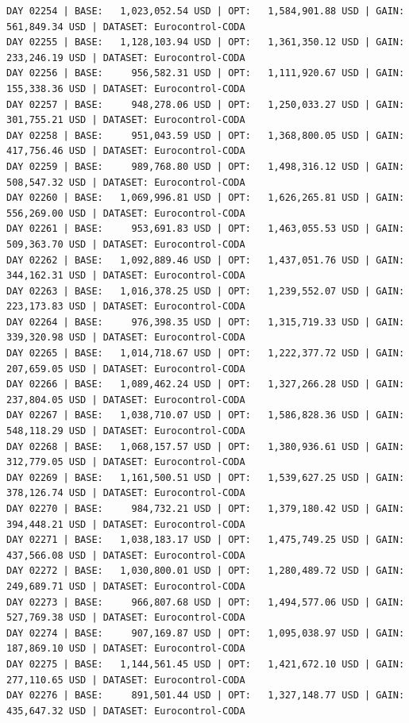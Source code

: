 \documentclass[11pt,a4paper]{article}
\begin{document}
\begin{verbatim}
DAY 02254 | BASE:   1,023,052.54 USD | OPT:   1,584,901.88 USD | GAIN: 561,849.34 USD | DATASET: Eurocontrol-CODA
DAY 02255 | BASE:   1,128,103.94 USD | OPT:   1,361,350.12 USD | GAIN: 233,246.19 USD | DATASET: Eurocontrol-CODA
DAY 02256 | BASE:     956,582.31 USD | OPT:   1,111,920.67 USD | GAIN: 155,338.36 USD | DATASET: Eurocontrol-CODA
DAY 02257 | BASE:     948,278.06 USD | OPT:   1,250,033.27 USD | GAIN: 301,755.21 USD | DATASET: Eurocontrol-CODA
DAY 02258 | BASE:     951,043.59 USD | OPT:   1,368,800.05 USD | GAIN: 417,756.46 USD | DATASET: Eurocontrol-CODA
DAY 02259 | BASE:     989,768.80 USD | OPT:   1,498,316.12 USD | GAIN: 508,547.32 USD | DATASET: Eurocontrol-CODA
DAY 02260 | BASE:   1,069,996.81 USD | OPT:   1,626,265.81 USD | GAIN: 556,269.00 USD | DATASET: Eurocontrol-CODA
DAY 02261 | BASE:     953,691.83 USD | OPT:   1,463,055.53 USD | GAIN: 509,363.70 USD | DATASET: Eurocontrol-CODA
DAY 02262 | BASE:   1,092,889.46 USD | OPT:   1,437,051.76 USD | GAIN: 344,162.31 USD | DATASET: Eurocontrol-CODA
DAY 02263 | BASE:   1,016,378.25 USD | OPT:   1,239,552.07 USD | GAIN: 223,173.83 USD | DATASET: Eurocontrol-CODA
DAY 02264 | BASE:     976,398.35 USD | OPT:   1,315,719.33 USD | GAIN: 339,320.98 USD | DATASET: Eurocontrol-CODA
DAY 02265 | BASE:   1,014,718.67 USD | OPT:   1,222,377.72 USD | GAIN: 207,659.05 USD | DATASET: Eurocontrol-CODA
DAY 02266 | BASE:   1,089,462.24 USD | OPT:   1,327,266.28 USD | GAIN: 237,804.05 USD | DATASET: Eurocontrol-CODA
DAY 02267 | BASE:   1,038,710.07 USD | OPT:   1,586,828.36 USD | GAIN: 548,118.29 USD | DATASET: Eurocontrol-CODA
DAY 02268 | BASE:   1,068,157.57 USD | OPT:   1,380,936.61 USD | GAIN: 312,779.05 USD | DATASET: Eurocontrol-CODA
DAY 02269 | BASE:   1,161,500.51 USD | OPT:   1,539,627.25 USD | GAIN: 378,126.74 USD | DATASET: Eurocontrol-CODA
DAY 02270 | BASE:     984,732.21 USD | OPT:   1,379,180.42 USD | GAIN: 394,448.21 USD | DATASET: Eurocontrol-CODA
DAY 02271 | BASE:   1,038,183.17 USD | OPT:   1,475,749.25 USD | GAIN: 437,566.08 USD | DATASET: Eurocontrol-CODA
DAY 02272 | BASE:   1,030,800.01 USD | OPT:   1,280,489.72 USD | GAIN: 249,689.71 USD | DATASET: Eurocontrol-CODA
DAY 02273 | BASE:     966,807.68 USD | OPT:   1,494,577.06 USD | GAIN: 527,769.38 USD | DATASET: Eurocontrol-CODA
DAY 02274 | BASE:     907,169.87 USD | OPT:   1,095,038.97 USD | GAIN: 187,869.10 USD | DATASET: Eurocontrol-CODA
DAY 02275 | BASE:   1,144,561.45 USD | OPT:   1,421,672.10 USD | GAIN: 277,110.65 USD | DATASET: Eurocontrol-CODA
DAY 02276 | BASE:     891,501.44 USD | OPT:   1,327,148.77 USD | GAIN: 435,647.32 USD | DATASET: Eurocontrol-CODA

\end{verbatim}
\end{document}
